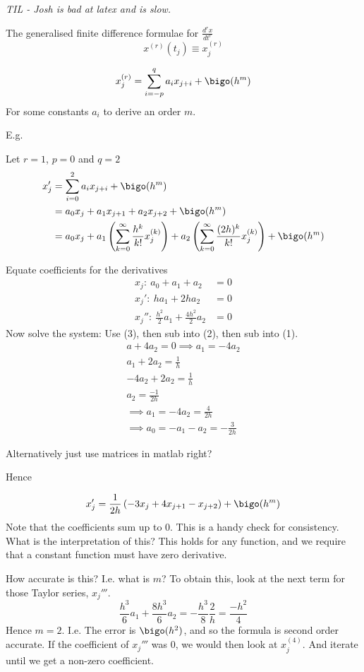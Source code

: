 \documentclass{X:/Documents/Coding/Latex/myassignment}
\begin{document}
\emph{TIL - Josh is bad at latex and is slow.}


The generalised finite difference formulae for $\frac{d^rx}{dt^r}$
\[x^{(r)}(t_j) \equiv x_j^{(r)}\]

\begin{align*}
    x_j^{(r)} = \sum_{i=-p}^q a_i x_{j+i} + \bigo(h^m)
\end{align*}
For some constants $a_i$ to derive an order $m$.

E.g.

Let $r=1$, $p=0$ and $q=2$
\begin{align*}
    x_j' &= \sum_{i=0}^2 a_i x_{j+i} + \bigo(h^m)\\
    &= a_0 x_{j} + a_1 x_{j+1} + a_2 x_{j+2} + \bigo(h^m)\\
    &= a_0 x_{j} + a_1\left(\sum_{k=0}^\infty \frac{h^k}{k!} x_j^{(k)}\right) + a_2 \left(\sum_{k=0}^\infty \frac{(2h)^{k}}{k!} x_j^{(k)}\right) + \bigo(h^m)\\
\end{align*}

Equate coefficients for the derivatives
\begin{align*}
    x_j:\  a_0 + a_1 + a_2 &= 0\\
    x_{j}':\  ha_1 + 2ha_2 &= 0\\
    x_{j}'':\ \frac{h^2}{2} a_1 + \frac{4h^2}{2} a_2 &= 0
\end{align*}
Now solve the system:
Use (3), then sub into (2), then sub into (1).
\begin{align*}
    a + 4a_2 = 0 \implies a_1 = -4a_2\\
    a_1 + 2a_2 = \frac1h\\
    -4a_2 + 2a_2 = \frac1h\\
    a_2 = \frac{-1}{2h}\\
    \implies a_1 = -4a_2 = \frac{4}{2h}\\
    \implies a_0 = -a_1 -a_2 =  -\frac{3}{2h}
\end{align*}

Alternatively just use matrices in matlab right?

Hence

\[x_j ' = \frac1{2h}\left(-3x_j + 4x_{j+1} - x_{j+2}\right) +\bigo(h^m)\]
Note that the coefficients sum up to $0$. This is a handy check for consistency. What is the interpretation of this? This holds for any function, and we require that a constant function must have zero derivative.  

How accurate is this? I.e. what is $m$? To obtain this, look at the next term for those Taylor series, $x_j'''$. 
\[\frac{h^3}{6} a_1 + \frac{8h^3}{6} a_2 = -\frac{h^3}{8} \frac2h = \frac{-h^2}{4}\]
Hence $m = 2$.
I.e. The error is $\bigo(h^2)$, and so the formula is second order accurate.
If the coefficient of $x_j'''$ was $0$, we would then look at $x_j^{(4)}$. And iterate until we get a non-zero coefficient.
\end{document}
